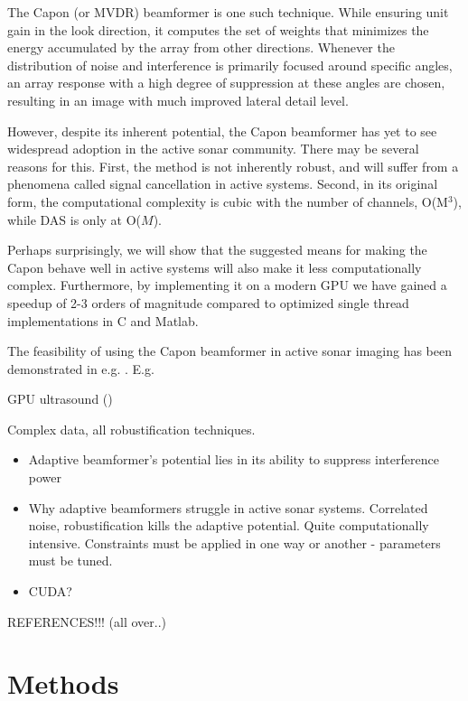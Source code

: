 \documentclass[10pt,a4paper]{article}
\newcounter{todoidx}
\newlength\marginparwidthsmall
\newcommand\todo[1]{%
      \addtocounter{todoidx}{1}%
      {\color{Red}\fbox{\bf\thetodoidx{}}}%
      \marginpar{%
         {\vspace*{-10pt}\color{Red}\fbox{\bf\thetodoidx{}}}\\%
         \fcolorbox{red}{todobackground}{\parbox{\marginparwidthsmall}{\scriptsize #1}}}}
\newcommand\todo[1]{}
\newcommand\1{\vec 1}
\renewcommand\gls[1]{#1}
\begin{document}
The Capon (or \gls{MVDR}) beamformer is one such technique. While ensuring unit gain in the look direction, it computes the set of weights that minimizes the energy accumulated by the array from other directions. Whenever the distribution of noise and interference is primarily focused around specific angles, an array response with a high degree of suppression at these angles are chosen, resulting in an image with much improved lateral detail level.

However, despite its inherent potential, the Capon beamformer has yet to see widespread adoption in the active sonar community. There may be several reasons for this. First, the method is not inherently robust, and will suffer from a phenomena called signal cancellation in active systems. Second, in its original form, the computational complexity is cubic with the number of channels, O(M$^3$), while \gls{DAS} is only at O($M$).

Perhaps surprisingly, we will show that the suggested means for making the Capon behave well in active systems will also make it less computationally complex. Furthermore, by implementing it on a modern \gls{GPU} we have gained a speedup of 2-3 orders of magnitude compared to optimized single thread implementations in C and Matlab.

The feasibility of using the Capon beamformer in active sonar imaging has been demonstrated in e.g. \cite{Blomberg2012a,Blomberg2011,Dursun2009}.
E.g. 

GPU ultrasound (\cite{So2011,Chen2011})

Complex data, all robustification techniques.

\begin{itemize}
\item Adaptive beamformer's potential lies in its ability to suppress interference power
\item Why adaptive beamformers struggle in active sonar systems. Correlated noise, robustification kills the adaptive potential. Quite computationally intensive. Constraints must be applied in one way or another - parameters must be tuned.
\item CUDA?
\end{itemize}

REFERENCES!!! (all over..)
\todo{Capon or MVDR?}
% 


\newpage
\section{Methods}\label{methods}
\end{document}
